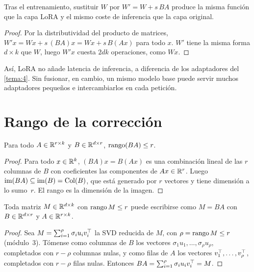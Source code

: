 \begin{proposicion}[Fusión]\label{prop:fusion}
Tras el entrenamiento, sustituir $W$ por $W'=W+s\,BA$ produce la misma función que la capa LoRA y el mismo coste de inferencia que la capa original.
\end{proposicion}

\begin{proof}
Por la distributividad del producto de matrices, $W'x=Wx+s\,(BA)x=Wx+s\,B(Ax)$ para todo $x$. $W'$ tiene la misma forma $d\times k$ que $W$, luego $W'x$ cuesta $2dk$ operaciones, como $Wx$.
\end{proof}

Así, LoRA no añade latencia de inferencia, a diferencia de los adaptadores del \cref{tema:4}. Sin fusionar, en cambio, un mismo modelo base puede servir muchos adaptadores pequeños e intercambiarlos en cada petición.

\section{Rango de la corrección}

\begin{proposicion}\label{prop:rango}
Para todo $A\in\mathbb{R}^{r\times k}$ y $B\in\mathbb{R}^{d\times r}$, $\operatorname{rango}(BA)\le r$.
\end{proposicion}

\begin{proof}
Para todo $x\in\mathbb{R}^{k}$, $(BA)x=B(Ax)$ es una combinación lineal de las $r$ columnas de $B$ con coeficientes las componentes de $Ax\in\mathbb{R}^{r}$. Luego $\operatorname{im}(BA)\subseteq\operatorname{im}(B)=\operatorname{Col}(B)$, que está generado por $r$ vectores y tiene dimensión a lo sumo~$r$. El rango es la dimensión de la imagen.
\end{proof}

\begin{proposicion}[Recíproco]\label{prop:factorizacion}
Toda matriz $M\in\mathbb{R}^{d\times k}$ con $\operatorname{rango} M\le r$ puede escribirse como $M=BA$ con $B\in\mathbb{R}^{d\times r}$ y $A\in\mathbb{R}^{r\times k}$.
\end{proposicion}

\begin{proof}
Sea $M=\sum_{i=1}^{\rho}\sigma_iu_iv_i^{\top}$ la SVD reducida de $M$, con $\rho=\operatorname{rango} M\le r$ (módulo~3). Tómense como columnas de $B$ los vectores $\sigma_1u_1,\dots,\sigma_\rho u_\rho$, completados con $r-\rho$ columnas nulas, y como filas de $A$ los vectores $v_1^{\top},\dots,v_\rho^{\top}$, completados con $r-\rho$ filas nulas. Entonces $BA=\sum_{i=1}^{\rho}\sigma_iu_iv_i^{\top}=M$.
\end{proof}

